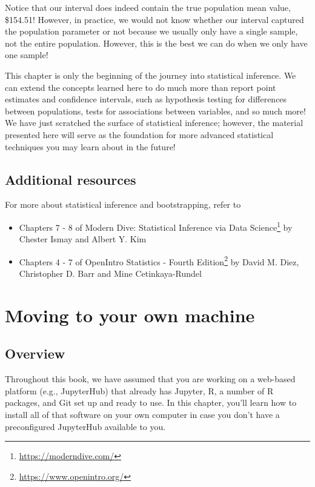 \documentclass[
]{krantz}
\providecommand{\tightlist}{%
  \setlength{\itemsep}{0pt}\setlength{\parskip}{0pt}}
\renewcommand{\href}[2]{#2\footnote{\url{#1}}}
\begin{document}
Notice that our interval does indeed contain the true
population mean value, \$154.51! However, in
practice, we would not know whether our interval captured the population parameter or not because we usually only have a single sample, not the entire population. However, this is the best we can do when we only have one sample!

This chapter is only the beginning of the journey into statistical inference. We can extend the concepts learned here to do much more than report point estimates and confidence intervals, such as hypothesis testing for differences between populations, tests for associations between variables, and so much more! We have just scratched the surface of statistical inference; however, the material presented here will serve as the foundation for more advanced statistical techniques you may learn about in the future!

\hypertarget{additional-resources-4}{%
\section{Additional resources}\label{additional-resources-4}}

For more about statistical inference and bootstrapping, refer to

\begin{itemize}
\tightlist
\item
  Chapters 7 - 8 of \href{https://moderndive.com/}{Modern Dive: Statistical
  Inference via Data Science} by Chester Ismay and Albert Y. Kim
\item
  Chapters 4 - 7 of \href{https://www.openintro.org/}{OpenIntro Statistics - Fourth Edition} by David M. Diez, Christopher D. Barr and Mine Cetinkaya-Rundel
\end{itemize}

\hypertarget{move-to-your-own-machine}{%
\chapter{Moving to your own machine}\label{move-to-your-own-machine}}

\hypertarget{overview-10}{%
\section{Overview}\label{overview-10}}

Throughout this book, we have assumed that you are working on a web-based platform
(e.g., JupyterHub) that already has Jupyter, R, a number of R packages, and Git set up and ready to use.
In this chapter, you'll learn how to install all of that software on your own computer in case
you don't have a preconfigured JupyterHub available to you.
\end{document}
